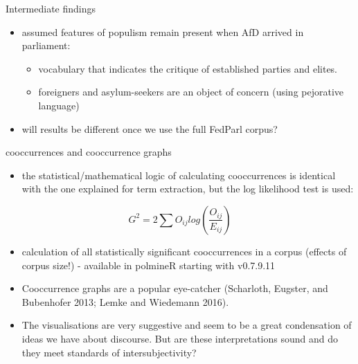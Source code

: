 \documentclass[
  ignorenonframetext,
]{beamer}
\providecommand{\tightlist}{%
  \setlength{\itemsep}{0pt}\setlength{\parskip}{0pt}}
\begin{document}
\begin{frame}{Intermediate findings}
\protect\hypertarget{intermediate-findings}{}

\begin{itemize}
\tightlist
\item
  assumed features of populism remain present when AfD arrived in
  parliament:

  \begin{itemize}
  \tightlist
  \item
    vocabulary that indicates the critique of established parties and
    elites.
  \item
    foreigners and asylum-seekers are an object of concern (using
    pejorative language)
  \end{itemize}
\item
  will results be different once we use the full FedParl corpus?
\end{itemize}

\end{frame}

\begin{frame}{cooccurrences and cooccurrence graphs}
\protect\hypertarget{cooccurrences-and-cooccurrence-graphs}{}

\begin{itemize}
\tightlist
\item
  the statistical/mathematical logic of calculating cooccurrences is
  identical with the one explained for term extraction, but the log
  likelihood test is used:
\end{itemize}

\[ G^{2} = 2 \sum{O_{ij} log(\frac{O_{ij}}{E_{ij}})} \]

\begin{itemize}
\item
  calculation of all statistically significant cooccurrences in a corpus
  (effects of corpus size!) - available in polmineR starting with
  v0.7.9.11
\item
  Cooccurrence graphs are a popular eye-catcher (Scharloth, Eugster, and
  Bubenhofer 2013; Lemke and Wiedemann 2016).
\item
  The visualisations are very suggestive and seem to be a great
  condensation of ideas we have about discourse. But are these
  interpretations sound and do they meet standards of intersubjectivity?
\end{itemize}

\end{frame}
\end{document}
